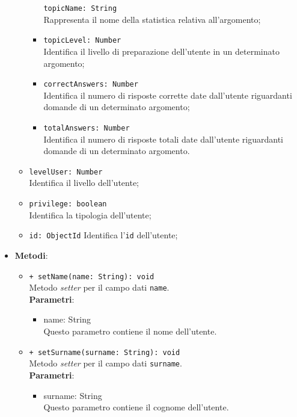 \begin{itemize}
\begin{itemize}
\begin{itemize}
					\texttt{topicName: String}\\
					Rappresenta il nome della statistica relativa all'argomento;	 
					\item
					\texttt{topicLevel: Number}\\
					Identifica il livello di preparazione dell'utente in un determinato argomento;
					\item
					\texttt{correctAnswers: Number}\\
					Identifica il numero di risposte corrette date dall'utente riguardanti domande di un determinato argomento; 
					\item						
					\texttt{totalAnswers: Number}\\
					Identifica il numero di risposte totali date dall'utente riguardanti domande di un determinato argomento.		
				\end{itemize}		
				\item 
				\texttt{levelUser: Number}\\
				Identifica il livello dell'utente;			
				\item 
				\texttt{privilege: boolean}\\
				Identifica la tipologia dell'utente;	
				\item
				\texttt{id: ObjectId}
				Identifica l'\texttt{id} dell'utente;
			\end{itemize}
			\item \textbf{Metodi}: 
			\begin{itemize}
				\item \texttt{+ setName(name: String): void} \\
				Metodo \textit{setter} per il campo dati \texttt{name}.\\
				\textbf{Parametri}:
				\begin{itemize}
					\item {name: String}\\
					Questo parametro contiene il nome dell'utente.
				\end{itemize}
				
				\item \texttt{+ setSurname(surname: String): void} \\
				Metodo \textit{setter} per il campo dati \texttt{surname}.\\
				\textbf{Parametri}:
				\begin{itemize}
					\item {surname: String}\\
					Questo parametro contiene il cognome dell'utente.
				\end{itemize}
				

\end{itemize}
\end{itemize}
